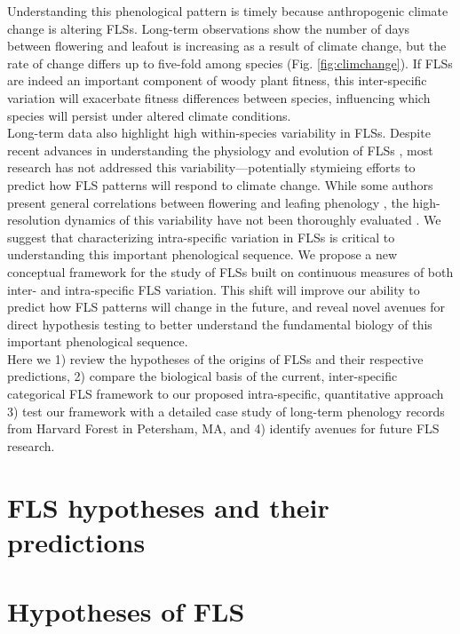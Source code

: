 \documentclass{article}
\begin{document}
\noindent Understanding this phenological pattern is timely because anthropogenic climate change is altering FLSs. Long-term observations show the number of days between flowering and leafout is increasing as a result of climate change, but the rate of change differs up to five-fold among species (Fig. \ref{fig:climchange}).  If FLSs are indeed an important component of woody plant fitness, this inter-specific variation will exacerbate fitness differences between species, influencing which species will persist under altered climate conditions.\\ %

\noindent Long-term data also highlight high within-species variability in FLSs. Despite recent advances in understanding the physiology and evolution of FLSs \citep{Gougherty2018,Savage2019}, most research has not addressed this variability---potentially stymieing efforts to predict how FLS patterns will respond to climate change. While some authors present general correlations between flowering and leafing phenology \citep{Lechowicz_1995, Ettinger2018}, the high-resolution dynamics of this variability have not been thoroughly evaluated \citep{Gougherty2018}. We suggest that characterizing intra-specific variation in FLSs is critical to understanding this important phenological sequence. We propose a new conceptual framework for the study of FLSs built on continuous measures of both inter- and intra-specific FLS variation. This shift will improve our ability to predict how FLS patterns will change in the future, and reveal novel avenues for direct hypothesis testing to better understand the fundamental biology of this important phenological sequence.\\

\noindent Here we 1) review the hypotheses of the origins of FLSs and their respective predictions, 2) compare the biological basis of the current, inter-specific categorical FLS framework to our proposed intra-specific, quantitative approach 3) test our framework with a detailed case study of long-term phenology records from Harvard Forest in Petersham, MA, and 4) identify avenues for future FLS research.
\section*{FLS hypotheses and their predictions}
\section*{Hypotheses of FLS}
\end{document}
